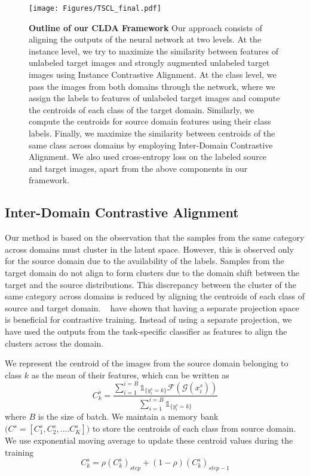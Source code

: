 \begin{figure}
    \centering
    \texttt{[image: Figures/TSCL\_final.pdf]}
    \vspace{1mm}
    \caption{\textbf{Outline of our CLDA Framework} Our approach consists of aligning the outputs of the neural network at two levels. At the instance level, we try to maximize the similarity between features of unlabeled target images and strongly augmented unlabeled target images using Instance Contrastive Alignment. At the class level, we pass the images from both domains through the network, where we assign the labels to features of unlabeled target images and compute the centroids of each class of the target domain. Similarly, we compute the centroids for source domain features using their class labels. Finally, we maximize the similarity between centroids of the same class across domains by employing Inter-Domain Contrastive Alignment. We also used cross-entropy loss on the labeled source and target images, apart from the above components in our framework.}
    \label{fig:overview}
\end{figure}

\subsection{Inter-Domain Contrastive Alignment}
Our method is based on the observation that the samples from the same category across domains must cluster in the latent space. However, this is observed only for the source domain due to the availability of the labels. Samples from the target domain do not align to form clusters due to the domain shift between the target and the source distributions. This discrepancy between the cluster of the same category across domains is reduced by aligning the centroids of each class of source and target domain. ~\cite{Chen2020ASF, Grill2020BootstrapYO} have shown that having a separate projection space is beneficial for contrastive training. Instead of using a separate projection, we have used the outputs from the task-specific classifier as features to align the clusters across the domain. 

We represent the centroid of the images from the source domain belonging to class $k$  as the mean of their features, which can be written as 
\begin{equation}
    C_k^s = \frac{\sum\limits_{i=1}^{i=B}\mathbb{1}_{\{y_i^s=k\}} \mathcal{F}(\mathcal{G}(x_i^s))}{\sum\limits_{i=1}^{i=B}\mathbb{1}_{\{y_i^s=k\}}}
    \label{Eq:mean}
\end{equation}
where $B$ is the size of batch. We maintain a memory bank $\big(C^s = [C_1^s,C_2^s,....C_K^s]\big)$ to store the centroids of each class from source domain. We  use exponential moving average to update these centroid values during the training
\vspace{2mm}
\[
    C_k^s = \rho(C_k^s)_{step} + (1-\rho)(C_k^s)_{step-1}
\]

